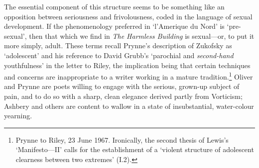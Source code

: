 \documentclass[]{article}
\begin{document}
\noindent The essential component of this structure seems to be
something like an opposition between seriousness and frivolousness,
coded in the language of sexual development. If the phenomenology
preferred in ‘l’Amerique du Nord’ is ‘pre-sexual’, then that which we
find in \emph{The Harmless Building} is sexual—or, to put it more
simply, adult. These terms recall Prynne’s description of Zukofsky as
‘adolescent’ and his reference to David Grubb’s ‘parochial and
\emph{second-hand} youthfulness’ in the letter to Riley, the implication
being that certain techniques and concerns are inappropriate to a writer
working in a mature tradition.\footnote{Prynne to Riley, 23 June 1967.
  Ironically, the second thesis of Lewis’s ‘Manifesto—II’ calls for the
  establishment of a ‘violent structure of adolescent clearness between
  two extremes’ (I.2).} Oliver and Prynne are poets willing to engage
with the serious, grown-up subject of pain, and to do so with a sharp,
clean elegance derived partly from Vorticism; Ashbery and others are
content to wallow in a state of insubstantial, water-colour yearning.
\end{document}
